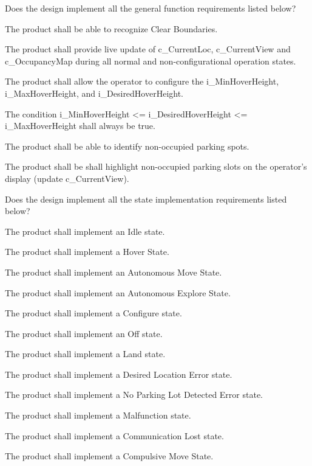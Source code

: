 \documentclass[12pt, titlepage]{article}
\begin{document}
\begin{todolist}
\label{Design1_Checklist}
\item Does the design implement all the general function requirements listed below?
\begin{todolist}
    \item The product shall be able to recognize Clear Boundaries.
    \item The product shall provide live update of c\_CurrentLoc, c\_CurrentView and c\_OccupancyMap during all normal and non-configurational operation states.
    \item The product shall allow the operator to configure the i\_MinHoverHeight, i\_MaxHoverHeight, and i\_DesiredHoverHeight.
    \item The condition i\_MinHoverHeight <= i\_DesiredHoverHeight <= i\_MaxHoverHeight shall always be true.
    \item The product shall be able to identify non-occupied parking spots.
    \item The product shall be shall highlight non-occupied parking slots on the operator's display (update c_CurrentView).
\end{todolist}
\item Does the design implement all the state implementation requirements listed below?
\begin{todolist}
    \item The product shall implement an Idle state.
    \item The product shall implement a Hover State.
    \item The product shall implement an Autonomous Move State.
    \item The product shall implement an Autonomous Explore State.
    \item The product shall implement a Configure state.
    \item The product shall implement an Off state.
    \item The product shall implement a Land state.
    \item The product shall implement a Desired Location Error state.
    \item The product shall implement a No Parking Lot Detected Error state.
    \item The product shall implement a Malfunction state.
    \item The product shall implement a Communication Lost state.
    \item The product shall implement a Compulsive Move State.

\end{todolist}
\end{todolist}
\end{document}
